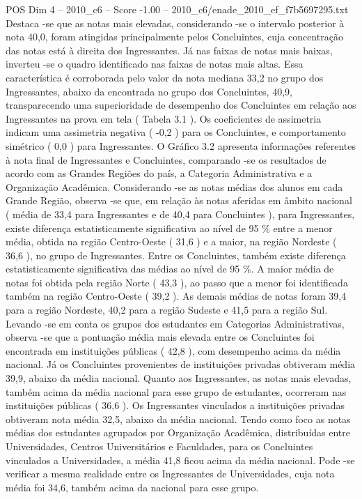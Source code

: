 \begin{textsample}{POS Dim 4 – 2010\_c6 – Score -1.00 – 2010\_c6/enade\_2010\_ef\_f7b5697295.txt}
Destaca -se que as notas mais elevadas, considerando -se o intervalo posterior à nota 40,0, foram atingidas principalmente pelos Concluintes, cuja concentração das notas está à direita dos Ingressantes.
Já nas faixas de notas mais baixas, inverteu -se o quadro identificado nas faixas de notas mais altas.
Essa característica é corroborada pelo valor da nota mediana 33,2 no grupo dos Ingressantes, abaixo da encontrada no grupo dos Concluintes, 40,9, transparecendo uma superioridade de desempenho dos Concluintes em relação aos Ingressantes na prova em tela ( Tabela 3.1 ).
Os coeficientes de assimetria indicam uma assimetria negativa ( -0,2 ) para os Concluintes, e comportamento simétrico ( 0,0 ) para Ingressantes.
O Gráfico 3.2 apresenta informações referentes à nota final de Ingressantes e Concluintes, comparando -se os resultados de acordo com as Grandes Regiões do país, a Categoria Administrativa e a Organização Acadêmica.
Considerando -se as notas médias dos alunos em cada Grande Região, observa -se que, em relação às notas aferidas em âmbito nacional ( média de 33,4 para Ingressantes e de 40,4 para Concluintes ), para Ingressantes, existe diferença estatisticamente significativa ao nível de 95 \% entre a menor média, obtida na região Centro-Oeste ( 31,6 ) e a maior, na região Nordeste ( 36,6 ), no grupo de Ingressantes.
Entre os Concluintes, também existe diferença estatisticamente significativa das médias ao nível de 95 \%.
A maior média de notas foi obtida pela região Norte ( 43,3 ), ao passo que a menor foi identificada também na região Centro-Oeste ( 39,2 ).
As demais médias de notas foram 39,4 para a região Nordeste, 40,2 para a região Sudeste e 41,5 para a região Sul.
Levando -se em conta os grupos dos estudantes em Categorias Administrativas, observa -se que a pontuação média mais elevada entre os Concluintes foi encontrada em instituições públicas ( 42,8 ), com desempenho acima da média nacional.
Já os Concluintes provenientes de instituições privadas obtiveram média 39,9, abaixo da média nacional.
Quanto aos Ingressantes, as notas mais elevadas, também acima da média nacional para esse grupo de estudantes, ocorreram nas instituições públicas ( 36,6 ).
Os Ingressantes vinculados a instituições privadas obtiveram nota média 32,5, abaixo da média nacional.
Tendo como foco as notas médias dos estudantes agrupados por Organização Acadêmica, distribuídas entre Universidades, Centros Universitários e Faculdades, para os Concluintes vinculados a Universidades, a média 41,8 ficou acima da média nacional.
Pode -se verificar a mesma realidade entre os Ingressantes de Universidades, cuja nota média foi 34,6, também acima da nacional para esse grupo.

\end{textsample}
